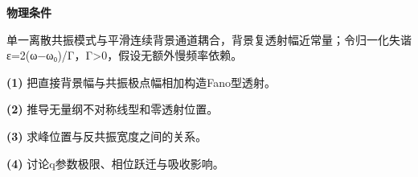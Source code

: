 \textbf{物理条件}\par 单一离散共振模式与平滑连续背景通道耦合，背景复透射幅近常量；令归一化失谐ε=2(ω−ω₀)/Γ，Γ>0，假设无额外慢频率依赖。
\par\noindent\textbf{(1)} 把直接背景幅与共振极点幅相加构造Fano型透射。
\par\noindent\textbf{(2)} 推导无量纲不对称线型和零透射位置。
\par\noindent\textbf{(3)} 求峰位置与反共振宽度之间的关系。
\par\noindent\textbf{(4)} 讨论q参数极限、相位跃迁与吸收影响。
